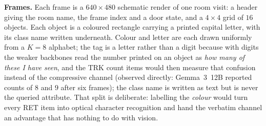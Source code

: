 \documentclass[10pt]{article}
\theoremstyle{definition}
\theoremstyle{plain}
\begin{document}
\textbf{Frames.} Each frame is a $640{\times}480$ schematic render of one room visit: a header giving the room name, the frame index and a door state, and a $4{\times}4$ grid of $16$ objects. Each object is a coloured rectangle carrying a printed capital letter, with its class name written underneath. Colour and letter are each drawn uniformly from a $K{=}8$ alphabet; the tag is a letter rather than a digit because with digits the weaker backbones read the number printed on an object as \emph{how many of these I have seen}, and the TRK count items would then measure that confusion instead of the compressive channel (observed directly: Gemma~3~12B reported counts of $8$ and $9$ after six frames); the class name is written as text but is never the queried attribute. That split is deliberate: labelling the \emph{colour} would turn every RET item into optical character recognition and hand the verbatim channel an advantage that has nothing to do with vision.
\end{document}
